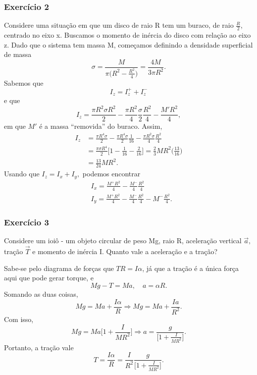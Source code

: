 \documentclass{article}
\begin{document}
\subsubsection{Exercício 2}
  Considere uma situação em que um disco de raio R tem um buraco, de raio \(\frac{R}{2}\), centrado no eixo x. Buscamos o momento de inércia do disco com relação ao eixo z. 
Dado que o sistema tem massa M, começamos definindo a densidade superficial de massa 
  \[
    \sigma = \frac{M}{\pi \biggl(R^{2}-\frac{R^{2}}{4}\biggr)} = \frac{4M}{3\pi R^{2}}.
  \]
Sabemos que 
  \[
    I_{z} = I_{z}^{+} + I_{z}^{-} 
  \]
  e que 
  \[
    I_{z} = \frac{\pi R^{2}\sigma R^{2}}{2} - \frac{\pi R^{2}}{4}\frac{\sigma }{2}\frac{R^{2}}{4} - \frac{M'R^{2}}{4},
  \]
  em que \(M'\) é a massa ``removida'' do buraco. Assim, 
  \begin{align*}
    I_{z} &= \frac{\pi R^{4}\sigma }{2} - \frac{\pi R^{4}\sigma }{2}\frac{1}{16} - \frac{\pi R^{2}\sigma }{4}\frac{R^{2}}{4}\\
    &= \frac{\pi \sigma R^{4}}{2}\biggl[1-\frac{1}{16}-\frac{2}{16}\biggr] = \frac{2}{3}MR^{2}\biggl(\frac{13}{16}\biggr)\\
    &= \frac{13}{24}MR^{2}.
  \end{align*}
  Usando que \(I_{z} = I_{x} + I_{y},\) podemos encontrar 
 \begin{align*}
   &I_{x} = \frac{M^{+}R^{2}}{4} - \frac{M^{-}}{4}\frac{R^{2}}{4}\\
   &I_{y} = \frac{M^{+}R^{2}}{4} - \frac{M^{-}}{4}\frac{R^{2}}{4} - M^{-}\frac{R^{2}}{4}.
 \end{align*}
\subsubsection{Exercício 3}
  Considere um ioiô - um objeto circular de peso Mg, raio R, aceleração vertical \(\vec{a},\) tração \(\vec{T}\) e momento de inércia I. Quanto vale a aceleração e a tração?

  Sabe-se pelo diagrama de forças que \(TR = I\alpha \), já que a tração é a única força aqui que pode gerar torque, e 
    \[
      Mg - T = Ma,\quad a = \alpha R.
    \]
    Somando as duas coisas, 
      \[
        Mg = Ma + \frac{I\alpha }{R} \Rightarrow Mg = Ma + \frac{Ia}{R^{2}}.
      \]
    Com isso, 
      \[
        Mg = Ma \biggl[1 + \frac{I}{MR^{2}}\biggr] \Rightarrow a = \frac{g}{\biggl[1 + \frac{I}{MR^{2}}\biggr]}.
      \]
    Portanto, a tração vale 
      \[
        T = \frac{I\alpha }{R} = \frac{I}{R^{2}}\frac{g}{\biggl[1 + \frac{I}{MR^{2}}\biggr]}.
      \]
\end{document}
